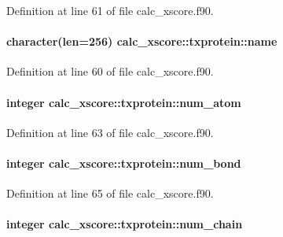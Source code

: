 Definition at line 61 of file calc\-\_\-xscore.\-f90.

\hypertarget{structcalc__xscore_1_1txprotein_afa0acd5392140675b62b46c98a514ec8}{
\paragraph[{name}]{\setlength{\rightskip}{0pt plus 5cm}character(len=256) calc\-\_\-xscore\-::txprotein\-::name}}\label{structcalc__xscore_1_1txprotein_afa0acd5392140675b62b46c98a514ec8}


Definition at line 60 of file calc\-\_\-xscore.\-f90.

\hypertarget{structcalc__xscore_1_1txprotein_a00a02265abe7cf1b18ac87c41d051357}{
\paragraph[{num\-\_\-atom}]{\setlength{\rightskip}{0pt plus 5cm}integer calc\-\_\-xscore\-::txprotein\-::num\-\_\-atom}}\label{structcalc__xscore_1_1txprotein_a00a02265abe7cf1b18ac87c41d051357}


Definition at line 63 of file calc\-\_\-xscore.\-f90.

\hypertarget{structcalc__xscore_1_1txprotein_adb84ec9cabf75b3e18bd223c04928114}{
\paragraph[{num\-\_\-bond}]{\setlength{\rightskip}{0pt plus 5cm}integer calc\-\_\-xscore\-::txprotein\-::num\-\_\-bond}}\label{structcalc__xscore_1_1txprotein_adb84ec9cabf75b3e18bd223c04928114}


Definition at line 65 of file calc\-\_\-xscore.\-f90.

\hypertarget{structcalc__xscore_1_1txprotein_a283f41d0171a26a830af0be1e30784c8}{
\paragraph[{num\-\_\-chain}]{\setlength{\rightskip}{0pt plus 5cm}integer calc\-\_\-xscore\-::txprotein\-::num\-\_\-chain}}\label{structcalc__xscore_1_1txprotein_a283f41d0171a26a830af0be1e30784c8}


